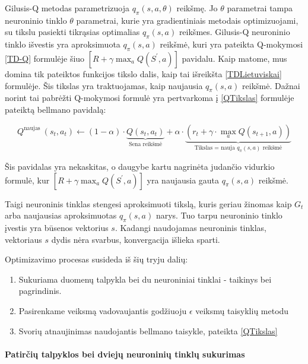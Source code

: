 \documentclass[a4paper, 12pt]{article}
\begin{document}
Gilusis-Q metodas parametrizuoja $q_{\pi}(s, a, \theta)$ reikšmę. Jo $\theta$ parametrai tampa neuroninio tinklo $\theta$ parametrai, kurie yra gradientiniais metodais optimizuojami, su tikslu pasiekti tikrąsias optimalias $q_{\pi}(s, a)$ reikšmes. Gilusis-Q neuroninio tinklo išvestis yra aproksimuota $q_{\pi}(s, a)$ reikšmė, kuri yra pateikta Q-mokymosi \ref{TD-Q} formulėje šiuo $\left[R+\gamma \max _{a} Q\left(S^{\prime}, a\right)\right]$ pavidalu. Kaip matome, mus domina tik pateiktos funkcijos tikslo dalis, kaip tai išreikšta \ref{TDLietuviskai} formulėje. Šis tikslas yra traktuojamas, kaip naujausia $q_{\pi}(s, a)$ reikšmė. Dažnai norint tai pabrėžti Q-mokymosi formulė yra pertvarkoma į \ref{QTikslas} formulėje pateiktą bellmano pavidalą:

\begin{equation}
\label{QTikslas}
Q^{\text {naujas }}\left(s_{t}, a_{t}\right) \leftarrow(1-\alpha) \cdot \underbrace{Q\left(s_{t}, a_{t}\right)}_{\text{Sena reikšmė}}+\alpha \cdot\underbrace{(r_{t}+\gamma \cdot \max _{a} Q\left(s_{t+1}, a\right))}_{\text{Tikslas = nauja $q_{\pi}(s, a)$ reikšmė}}
\end{equation} 


Šis pavidalas yra nekaskitas, o daugybe kartu nagrinėta judančio vidurkio formulė, kur $\left[R+\gamma \max _{a} Q\left(S^{\prime}, a\right)\right]$ yra naujausia gauta $q_{\pi}(s, a)$ reikšmė.

Taigi neuroninis tinklas stengesi aproksimuoti tikslą, kuris geriau žinomas kaip $G_t$ arba naujausias aproksimuotas $q_{\pi}(s, a)$ narys. Tuo tarpu neuroninio tinklo įvestis yra būsenos vektorius $s$. Kadangi naudojamas neuroninis tinklas, vektoriaus $s$ dydis nėra svarbus, konvergacija išlieka sparti. 

Optimizavimo procesas susideda iš šių tryju dalių:

\begin{enumerate}
  \addtolength{\itemsep}{-0.5\baselineskip} 
  \item Sukuriama duomenų talpykla bei du neuroniniai tinklai - taikinys bei pagrindinis.
  \item Pasirenkame veiksmą vadovaujantis godžiuoju $\epsilon$ veiksmų taisyklių metodu
  \item Svorių atnaujinimas naudojantis bellmano taisykle, pateikta \ref{QTikslas}
\end{enumerate}

\paragraph{Patirčių talpyklos bei dviejų neuroninių tinklų sukurimas}
\end{document}
